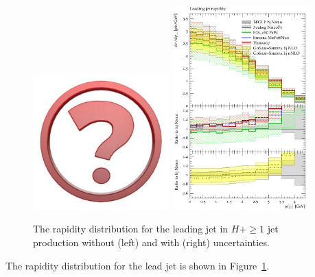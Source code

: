\begin{figure}[t!]
  \centering
  \includegraphics[width=0.47\textwidth]{Micon.pdf}
  \hfill
  \includegraphics[width=0.47\textwidth]{figures/hjetscomp_jet1_y.pdf}
  \caption{
    The rapidity distribution for the leading jet in $H+\ge1$ jet production
    without (left) and with (right) uncertainties. 
    \label{fig:higgscomp:results:1obs:j1y}
  }
\end{figure}

The rapidity distribution for the lead jet is shown in
Figure~\ref{fig:higgscomp:results:1obs:j1y}.


